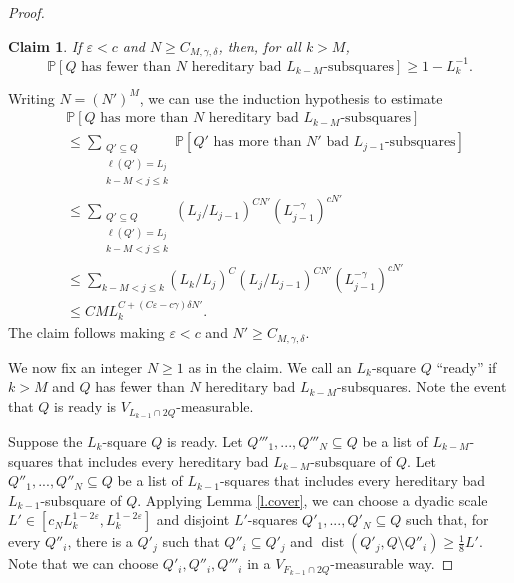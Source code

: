\documentclass{amsart}
\newtheorem{claim}[equation]{Claim}
\newcommand{\lref}[1]{Lemma \ref{l.#1}}
\numberwithin{equation}{section}
\numberwithin{figure}{section}
\renewcommand{\P}{\mathbb{P}}
\newcommand{\ep}{\varepsilon}
\newcommand{\dist}{\operatorname{dist}}
\begin{document}
\begin{proof}
\begin{claim}
If $\ep < c$ and $N \geq C_{M,\gamma,\delta}$, then, for all $k > M$, 
\begin{equation*}
\P[\mbox{$Q$ has fewer than $N$ hereditary bad $L_{k-M}$-subsquares}] \geq 1 - L_k^{-1}.
\end{equation*}
\end{claim}

Writing $N = (N')^M$, we can use the induction hypothesis to estimate
\begin{equation*}
\begin{aligned}
& \P[\mbox{$Q$ has more than $N$ hereditary bad $L_{k-M}$-subsquares}] \\
& \leq \sum_{\substack{Q' \subseteq Q \\ \ell(Q') = L_j \\ k-M < j \leq k}} \P[\mbox{$Q'$ has more than $N'$ bad $L_{j-1}$-subsquares}] \\
& \leq \sum_{\substack{Q' \subseteq Q \\ \ell(Q') = L_j \\ k-M < j \leq k}} (L_j/L_{j-1})^{CN'} (L_{j-1}^{-\gamma})^{c N'} \\
& \leq \sum_{k-M < j \leq k} (L_k/L_j)^C (L_j/L_{j-1})^{CN'} (L_{j-1}^{-\gamma})^{c N'} \\
& \leq C M L_k^{C + (C \ep - c \gamma) \delta N'}.
\end{aligned}
\end{equation*}
The claim follows making $\ep < c$ and $N' \geq C_{M,\gamma,\delta}$.

We now fix an integer $N \geq 1$ as in the claim.  We call an $L_k$-square $Q$ ``ready'' if $k > M$ and $Q$ has fewer than $N$ hereditary bad $L_{k-M}$-subsquares.  Note the event that $Q$ is ready is $V_{L_{k-1} \cap 2Q}$-measurable.

Suppose the $L_k$-square $Q$ is ready.  Let $Q'''_1, ..., Q'''_N \subseteq Q$ be a list of $L_{k-M}$-squares that includes every hereditary bad $L_{k-M}$-subsquare of $Q$.  Let $Q''_1, ..., Q''_N \subseteq Q$ be a list of $L_{k-1}$-squares that includes every hereditary bad $L_{k-1}$-subsquare of $Q$.  Applying \lref{cover}, we can choose a dyadic scale $L' \in [c_N L_k^{1-2\ep}, L_k^{1-2\ep}]$ and disjoint $L'$-squares $Q'_1, ..., Q'_N \subseteq Q$ such that, for every $Q''_i$, there is a $Q'_j$ such that $Q''_i \subseteq Q'_j$ and $\dist(Q'_j, Q \setminus Q''_i) \geq \tfrac18 L'$.  Note that we can choose $Q'_i, Q''_i, Q'''_i$ in a $V_{F_{k-1} \cap 2Q}$-measurable way.


\end{proof}
\end{document}

